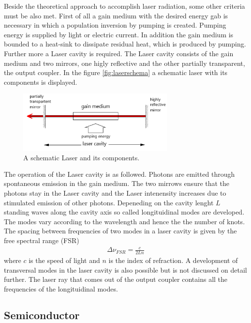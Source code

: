 Beside the theoretical approach to
accomplish laser radiation, some other criteria
must be also met.
First of all a gain medium with the desired
energy gab is necessary in which
a population inversion by pumping is created.
Pumping energy is supplied by light or electric current.
In addition the gain medium is bounded to a heat-sink
to dissipate residual heat, which is produced by pumping.
Further more a Laser cavity is required.
The Laser cavity consists of the gain medium and two
mirrors, one higly reflective and the other
partially transparent,
the output coupler.
In the figure \ref{fig:laserschema}
a schematic laser with its components is displayed.
\begin{figure}
\centering
\includegraphics[width=0.7\textwidth]{laserkonzept.png}
\caption{A schematic Laser and its components.
\cite{wiki_diode}}
\label{fig:equi}
\end{figure}
The operation of the Laser cavity is as followed.
Photons are emitted through spontaneous emission
in the gain medium. The two mirrows
ensure that the photons stay in the Laser cavity
and the Laser intenensity increases due to
stimulated emission of other photons.
Depeneding on the cavity lenght $L$
standing waves along the cavity axis so called longituidinal modes
are developed.
The modes vary according to the wavelength and hence
the the number of knots. The spacing
between frequencies of two modes in a laser
cavity is given by the free spectral range (FSR)
\begin{align}
\Delta \nu_{FSR} = \frac{c}{2Ln}
\end{align}
where $c$ is the speed of light and $n$ is
the index of refraction.
A development of transversal modes in the laser cavity
is also possible but is not discussed on detail further.
The laser ray that comes out of the output coupler
contains all the frequencies of the longituidinal modes.

\subsection{Semiconductor}
\label{subsec:Semiconductor}

